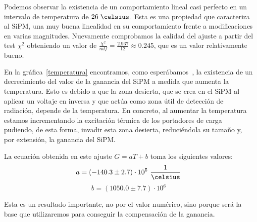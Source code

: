 \begin{itemize}
Podemos observar la existencia de un comportamiento lineal casi perfecto en un intervalo de temperatura de $26~\celsius$. Esta es una propiedad que caracteriza al SiPM, una muy buena linealidad en su comportamiento frente a modificaciones en varias magnitudes. Nuevamente comprobamos la calidad del ajuste a partir del test $\chi^2$ obteniendo un valor de $\frac{\chi^2}{ndf}=\frac{2.937}{12}\approx 0.245$, que es un valor relativamente bueno.

En la gráfica~\ref{temperatura} encontramos, como esperábamos~\cite{tesisSiPM}, la existencia de un decrecimiento del valor de la ganancia del SiPM a medida que aumenta la temperatura. Esto es debido a que la zona desierta, que se crea en el SiPM al aplicar un voltaje en inversa y que actúa como zona útil de detección de radiación, depende de la temperatura. En concreto, al aumentar la temperatura estamos incrementando la excitación térmica de los portadores de carga pudiendo, de esta forma, invadir esta zona desierta, reduciéndola su tamaño y, por extensión, la ganancia del SiPM.

La ecuación obtenida en este ajuste $G=aT+b$ toma los siguientes valores: 
\begin{equation}
a=(-140.3 \pm 2.7) \cdot 10^5~\frac{1}{\celsius}
\label{ajustependientetemperatura}
\end{equation}
\begin{equation}
b=(1050.0 \pm 7.7) \cdot 10^6
\label{ajusteordenadatemperatura}
\end{equation}


Esta es un resultado importante, no por el valor numérico, sino porque será la base que utilizaremos para conseguir la compensación de la ganancia.
\end{itemize}